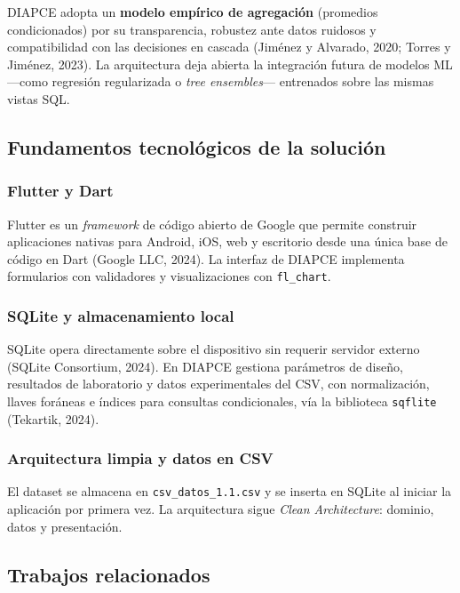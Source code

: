 \documentclass[12pt, letterpaper]{article}
\begin{document}
DIAPCE adopta un \textbf{modelo empírico de agregación} (promedios condicionados) por su transparencia, robustez ante datos ruidosos y compatibilidad con las decisiones en cascada (Jiménez y Alvarado, 2020; Torres y Jiménez, 2023). La arquitectura deja abierta la integración futura de modelos ML ---como regresión regularizada o \textit{tree ensembles}--- entrenados sobre las mismas vistas SQL.

\subsection{Fundamentos tecnológicos de la solución}

\subsubsection*{Flutter y Dart}
Flutter es un \textit{framework} de código abierto de Google que permite construir aplicaciones nativas para Android, iOS, web y escritorio desde una única base de código en Dart (Google LLC, 2024). La interfaz de DIAPCE implementa formularios con validadores y visualizaciones con \texttt{fl\_chart}.

\subsubsection*{SQLite y almacenamiento local}
SQLite opera directamente sobre el dispositivo sin requerir servidor externo (SQLite Consortium, 2024). En DIAPCE gestiona parámetros de diseño, resultados de laboratorio y datos experimentales del CSV, con normalización, llaves foráneas e índices para consultas condicionales, vía la biblioteca \texttt{sqflite} (Tekartik, 2024).

\subsubsection*{Arquitectura limpia y datos en CSV}
El dataset se almacena en \texttt{csv\_datos\_1.1.csv} y se inserta en SQLite al iniciar la aplicación por primera vez. La arquitectura sigue \textit{Clean Architecture}: dominio, datos y presentación.

\subsection{Trabajos relacionados}
\end{document}
